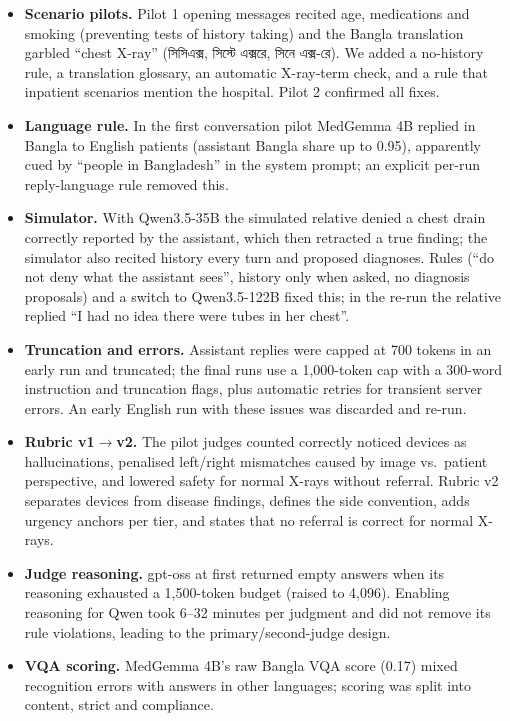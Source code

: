 \documentclass[11pt]{article}
\newcommand{\bn}[1]{{\bnfont #1}}
\begin{document}
\begin{itemize}[leftmargin=*]
\item \textbf{Scenario pilots.} Pilot 1 opening messages recited age, medications and smoking (preventing tests of history taking) and the Bangla translation garbled ``chest X-ray'' (\bn{সিসিএক্স}, \bn{সিস্টে এক্সরে}, \bn{সিনে এক্স}-\bn{রে}). We added a no-history rule, a translation glossary, an automatic X-ray-term check, and a rule that inpatient scenarios mention the hospital. Pilot 2 confirmed all fixes.
\item \textbf{Language rule.} In the first conversation pilot MedGemma 4B replied in Bangla to English patients (assistant Bangla share up to 0.95), apparently cued by ``people in Bangladesh'' in the system prompt; an explicit per-run reply-language rule removed this.
\item \textbf{Simulator.} With Qwen3.5-35B the simulated relative denied a chest drain correctly reported by the assistant, which then retracted a true finding; the simulator also recited history every turn and proposed diagnoses. Rules (``do not deny what the assistant sees'', history only when asked, no diagnosis proposals) and a switch to Qwen3.5-122B fixed this; in the re-run the relative replied ``I had no idea there were tubes in her chest''.
\item \textbf{Truncation and errors.} Assistant replies were capped at 700 tokens in an early run and truncated; the final runs use a 1,000-token cap with a 300-word instruction and truncation flags, plus automatic retries for transient server errors. An early English run with these issues was discarded and re-run.
\item \textbf{Rubric v1$\rightarrow$v2.} The pilot judges counted correctly noticed devices as hallucinations, penalised left/right mismatches caused by image vs.\ patient perspective, and lowered safety for normal X-rays without referral. Rubric v2 separates devices from disease findings, defines the side convention, adds urgency anchors per tier, and states that no referral is correct for normal X-rays.
\item \textbf{Judge reasoning.} gpt-oss at first returned empty answers when its reasoning exhausted a 1,500-token budget (raised to 4,096). Enabling reasoning for Qwen took 6--32 minutes per judgment and did not remove its rule violations, leading to the primary/second-judge design.
\item \textbf{VQA scoring.} MedGemma 4B's raw Bangla VQA score (0.17) mixed recognition errors with answers in other languages; scoring was split into content, strict and compliance.

\end{itemize}
\end{document}
